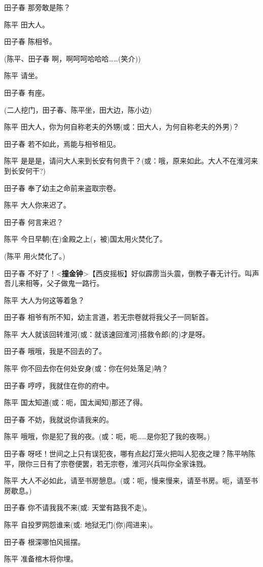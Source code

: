 田子春 那旁敢是陈？

陈平 田大人。

田子春 陈相爷。

(陈平、田子春 啊，啊呵呵哈哈哈\ldots{}\ldots{}(笑介))

陈平 请坐。

田子春 有座。

(二人挖门，田子春、陈平坐，田大边，陈小边)

陈平 田大人，你为何自称老夫的外甥(或：田大人，为何自称老夫的外男)？

田子春 若不如此，焉能与相爷相见。

陈平
是是是，请问大人来到长安有何贵干？(或：哦，原来如此。大人不在淮河来到长安何干?)

田子春 奉了幼主之命前来盗取宗卷。

陈平 大人你来迟了。

田子春 何言来迟？

陈平 今日早朝(在)金殿之上(，被)国太用火焚化了。

(陈平 用火焚化了。)

田子春
不好了！\textless{}\textbf{撞金钟}\textgreater{}【西皮摇板】好似霹雳当头震，倒教子春无计行。叫声吾儿来相等，父子做鬼一路行。

陈平 大人为何这等着急？

田子春 相爷有所不知，幼主言道，若无宗卷就将我父子一同斩首。

陈平 大人就该回转淮河(或：就该速回淮河)搭救令郎(的)才是呀。

田子春 哦哦，我是不回去的了。

陈平 你不回去你在何处安身(或：你在何处落足)呐？

田子春 哼哼，我就住在你的府中。

陈平 国太知道(或：呃，国太闻知)那还了得。

田子春 不妨，我就说你请我来的。

陈平
哦哦，你是犯了我的夜。(或：呃，呃\ldots{}\ldots{}是你犯了我的夜啊。)

田子春
呀呸！世间之上只有误犯夜，哪有点起灯笼火把叫人犯夜之理？陈平呐陈平，限你三日有了宗卷便罢，若无宗卷，淮河兴兵叫你全家诛戮。

陈平
大人不必如此，请至书房憩息。(或：呃，慢来慢来，请至书房。呃，请至书房歇息。)

田子春 你不请我我不来(或: 天堂有路我不走)。

陈平 自投罗网怨谁来(或: 地狱无门(你)闯进来)。

田子春 根深哪怕风摇摆。

陈平 准备棺木将你埋。

